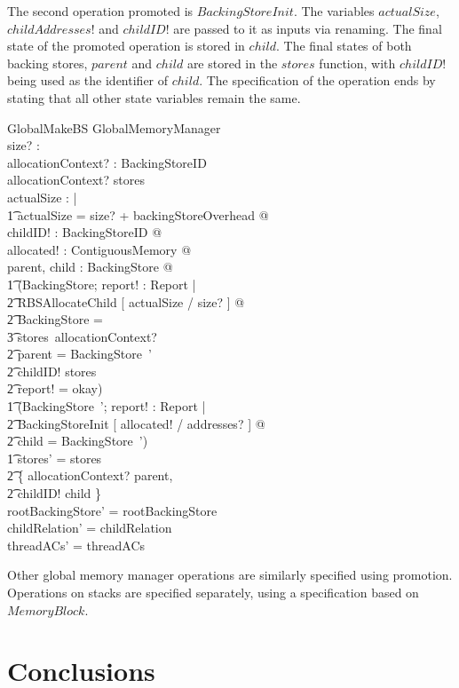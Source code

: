 \documentclass[a4paper,10pt]{report}
\begin{document}
The second operation promoted is $BackingStoreInit$. The variables
$actualSize$, $childAddresses!$ and $childID!$ are passed to it as inputs via
renaming. The final state of the promoted operation is stored in $child$.  The final 
states of both backing stores, $parent$ and $child$ are stored in the $stores$
function, with $childID!$ being used as the identifier of $child$. The 
specification of the operation ends by stating that all other state variables
remain the same.
%
\begin{schema}{GlobalMakeBS}
  \Delta GlobalMemoryManager \\
  size? : \nat \\
  allocationContext? : BackingStoreID \\
\where
  allocationContext? \in \dom stores \\
  \exists actualSize : \nat | \\
  \t1 actualSize = size? + backingStoreOverhead @ \\
  \exists childID! : BackingStoreID @ \\
  \exists allocated! : ContiguousMemory @ \\
  \exists parent, child : BackingStore @ \\
  \t1 (\exists \Delta BackingStore; report! : Report | \\
    \t2 RBSAllocateChild [ actualSize / size? ] @ \\
    \t2 \theta BackingStore = \\
      \t3 stores~allocationContext? \land \\
    \t2 parent = \theta BackingStore~' \land \\
    \t2 childID! \notin \dom stores \land \\
    \t2 report! = okay) \land \\
  \t1 (\exists BackingStore~'; report! : Report | \\
    \t2 BackingStoreInit [ allocated! / addresses? ] @ \\
    \t2 child = \theta BackingStore~') \land \\
  \t1 stores' = stores \oplus \\
    \t2 \{ allocationContext? \mapsto parent, \\
    \t2 childID! \mapsto child \} \\
  rootBackingStore' = rootBackingStore \\
  childRelation' = childRelation \\
  threadACs' = threadACs \\
\end{schema}
%
Other global memory manager operations are similarly specified using
promotion. Operations on stacks are specified separately, using a
specification based on $MemoryBlock$.

\chapter{Conclusions}
\label{conclusions-chapter}


\raggedright
\printbibliography
\end{document}
